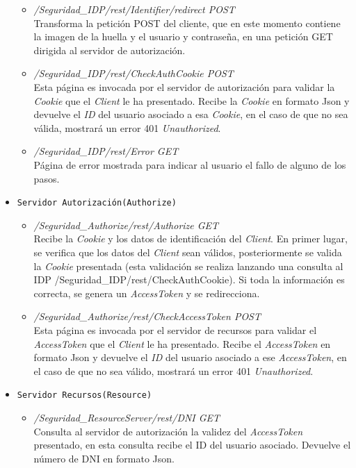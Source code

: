 \documentclass[a4,12pt,onecolum]{article}
\begin{document}
\begin{itemize}
\begin{itemize}
		\item \emph{/Seguridad\_IDP/rest/Identifier/redirect	POST} \\
		Transforma la petición POST del cliente, que en este momento contiene la imagen de la huella y el  usuario y contraseña, en una petición GET dirigida al servidor de autorización.

		\item \emph{/Seguridad\_IDP/rest/CheckAuthCookie	POST} \\
		Esta página es invocada por el servidor de autorización para validar la \emph{Cookie} que el \emph{Client} le ha presentado. Recibe la \emph{Cookie} en formato Json y devuelve el \emph{ID} del usuario asociado a esa \emph{Cookie}, en el caso de que no sea válida, mostrará un error 401 \emph{Unauthorized}.

		\item \emph{/Seguridad\_IDP/rest/Error	GET} \\
		Página de error mostrada para indicar al usuario el fallo de alguno de los pasos.
	\end{itemize}

\item \texttt{Servidor Autorización(Authorize)}
	\begin{itemize}
		\item \emph{/Seguridad\_Authorize/rest/Authorize	GET} \\
		Recibe la \emph{Cookie} y los datos de identificación del \emph{Client}. En primer lugar, se verifica que los datos del \emph{Client} sean válidos, posteriormente se valida la \emph{Cookie} presentada (esta validación se realiza lanzando una consulta al IDP {/Seguridad\_IDP/rest/CheckAuthCookie}). Si toda la información es correcta, se genera un \emph{AccessToken} y se redirecciona.

		\item \emph{/Seguridad\_Authorize/rest/CheckAccessToken	POST} \\
		Esta página es invocada por el servidor de recursos para validar el \emph{AccessToken} que el 					\emph{Client} le ha presentado. Recibe el \emph{AccessToken} en formato Json y devuelve el \emph{ID} 			del	usuario asociado a ese \emph{AccessToken}, en el caso de que no sea válido, mostrará un error 401 			\emph{Unauthorized}.
	\end{itemize}

\item \texttt{Servidor Recursos(Resource)}
	\begin{itemize}
		\item \emph{/Seguridad\_ResourceServer/rest/DNI	GET} \\
		Consulta al servidor de autorización la validez del \emph{AccessToken} presentado, en esta consulta 			recibe el ID del usuario asociado. Devuelve el número de DNI en formato Json.


\end{itemize}
\end{itemize}
\end{document}
